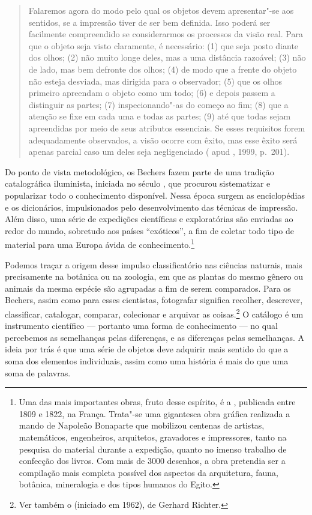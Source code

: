 \begin{quote}
Falaremos agora do modo pelo qual os objetos devem apresentar"-se aos
sentidos, se a impressão tiver de ser bem definida. Isso poderá ser
facilmente compreendido se considerarmos os processos da visão real.
Para que o objeto seja visto claramente, é necessário: (1) que seja
posto diante dos olhos; (2) não muito longe deles, mas a uma distância
razoável; (3) não de lado, mas bem defronte dos olhos; (4) de modo que a
frente do objeto não esteja desviada, mas dirigida para o observador;
(5) que os olhos primeiro apreendam o objeto como um todo; (6) e depois
passem a distinguir as partes; (7) inspecionando"-as do começo ao fim;
(8) que a atenção se fixe em cada uma e todas as partes; (9) até que
todas sejam apreendidas por meio de seus atributos essenciais. Se esses
requisitos forem adequadamente observados, a visão ocorre com êxito, mas
esse êxito será apenas parcial caso um deles seja negligenciado
( apud , 1999, p.~201).
\end{quote}

Do ponto de vista metodológico, os Bechers fazem parte de uma tradição
catalográfica iluminista, iniciada no século , que procurou
sistematizar e popularizar todo o conhecimento disponível. Nessa época
surgem as enciclopédias e os dicionários, impulsionados pelo
desenvolvimento das técnicas de impressão. Além disso, uma série de
expedições científicas e exploratórias são enviadas ao redor do mundo,
sobretudo aos países ``exóticos'', a fim de coletar todo tipo de
material para uma Europa ávida de conhecimento.\footnote{Uma das mais
  importantes obras, fruto desse espírito, é a {}, publicada entre 1809 e 1822, na França. Trata"-se uma
  gigantesca obra gráfica realizada a mando de Napoleão Bonaparte que
  mobilizou centenas de artistas, matemáticos, engenheiros, arquitetos,
  gravadores e impressores, tanto na pesquisa do material durante a
  expedição, quanto no imenso trabalho de confecção dos livros. Com mais
  de 3000 desenhos, a obra pretendia ser a compilação mais completa
  possível dos aspectos da arquitetura, fauna, botânica, mineralogia e
  dos tipos humanos do Egito.}

Podemos traçar a origem desse impulso classificatório nas ciências
naturais, mais precisamente na botânica ou na zoologia, em que as
plantas do mesmo gênero ou animais da mesma espécie são agrupadas a fim
de serem comparados. Para os Bechers, assim como para esses cientistas,
fotografar significa recolher, descrever, classificar, catalogar,
comparar, colecionar e arquivar as coisas.\footnote{Ver também o
  {} (iniciado em 1962), de Gerhard Richter.} O catálogo é um
instrumento científico --- portanto uma forma de conhecimento --- no qual
percebemos as semelhanças pelas diferenças, e as diferenças pelas
semelhanças. A ideia por trás é que uma série de objetos deve adquirir
mais sentido do que a soma dos elementos individuais, assim como uma
história é mais do que uma soma de palavras.

